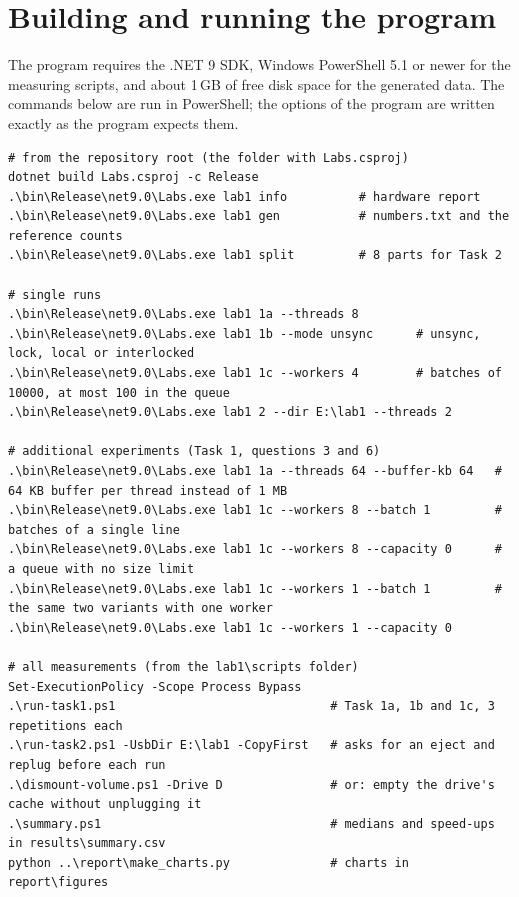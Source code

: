\documentclass[11pt,a4paper]{article}
\begin{document}
\appendix

\section{Building and running the program}\label{app:run}

The program requires the .NET 9 SDK, Windows PowerShell 5.1 or newer for the measuring scripts, and
about 1\,GB of free disk space for the generated data. The commands below are run in PowerShell; the
options of the program are written exactly as the program expects them.

\begin{lstlisting}
# from the repository root (the folder with Labs.csproj)
dotnet build Labs.csproj -c Release
.\bin\Release\net9.0\Labs.exe lab1 info          # hardware report
.\bin\Release\net9.0\Labs.exe lab1 gen           # numbers.txt and the reference counts
.\bin\Release\net9.0\Labs.exe lab1 split         # 8 parts for Task 2

# single runs
.\bin\Release\net9.0\Labs.exe lab1 1a --threads 8
.\bin\Release\net9.0\Labs.exe lab1 1b --mode unsync      # unsync, lock, local or interlocked
.\bin\Release\net9.0\Labs.exe lab1 1c --workers 4        # batches of 10000, at most 100 in the queue
.\bin\Release\net9.0\Labs.exe lab1 2 --dir E:\lab1 --threads 2

# additional experiments (Task 1, questions 3 and 6)
.\bin\Release\net9.0\Labs.exe lab1 1a --threads 64 --buffer-kb 64   # 64 KB buffer per thread instead of 1 MB
.\bin\Release\net9.0\Labs.exe lab1 1c --workers 8 --batch 1         # batches of a single line
.\bin\Release\net9.0\Labs.exe lab1 1c --workers 8 --capacity 0      # a queue with no size limit
.\bin\Release\net9.0\Labs.exe lab1 1c --workers 1 --batch 1         # the same two variants with one worker
.\bin\Release\net9.0\Labs.exe lab1 1c --workers 1 --capacity 0

# all measurements (from the lab1\scripts folder)
Set-ExecutionPolicy -Scope Process Bypass
.\run-task1.ps1                              # Task 1a, 1b and 1c, 3 repetitions each
.\run-task2.ps1 -UsbDir E:\lab1 -CopyFirst   # asks for an eject and replug before each run
.\dismount-volume.ps1 -Drive D               # or: empty the drive's cache without unplugging it
.\summary.ps1                                # medians and speed-ups in results\summary.csv
python ..\report\make_charts.py              # charts in report\figures
\end{lstlisting}
\end{document}
